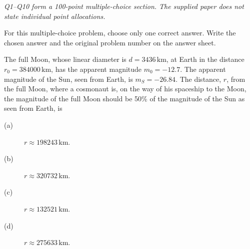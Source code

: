 \textit{Q1--Q10 form a 100-point multiple-choice section. The supplied paper
does not state individual point allocations.}

For this multiple-choice problem, choose only one correct answer. Write the
chosen answer and the original problem number on the answer sheet.

The full Moon, whose linear diameter is $d=3436\,\mathrm{km}$, at Earth in
the distance $r_0=384000\,\mathrm{km}$, has the apparent magnitude $m_0=-12.7$.
The apparent magnitude of the Sun, seen from Earth, is $m_S=-26.84$.
The distance, $r$, from the full Moon, where a cosmonaut is, on the way of his
spaceship to the Moon, the magnitude of the full Moon should be 50\% of the
magnitude of the Sun as seen from Earth, is
\begin{description}
\item[(a)] $r\approx198243\,\mathrm{km}$.
\item[(b)] $r\approx320732\,\mathrm{km}$.
\item[(c)] $r\approx132521\,\mathrm{km}$.
\item[(d)] $r\approx275633\,\mathrm{km}$.
\end{description}
